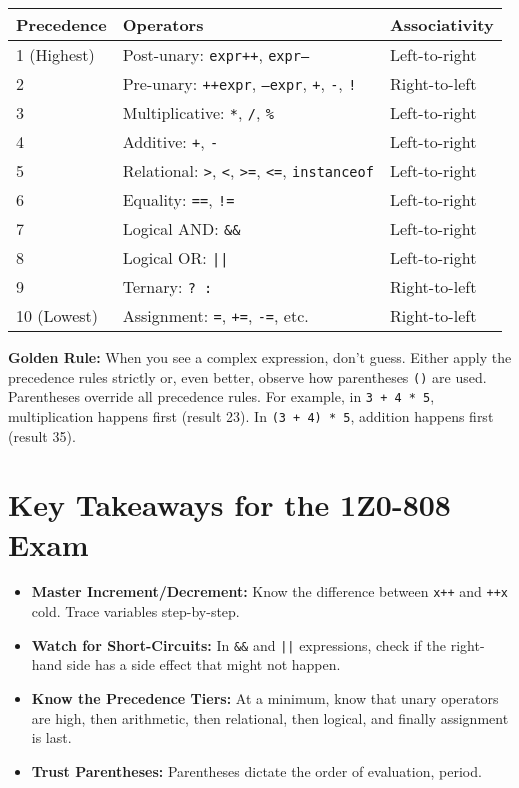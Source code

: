 \documentclass[12pt]{article}
\begin{document}
\begin{enumerate}[label=(\arabic*)]
\begin{tabular}{|l|l|l|}
\hline
\textbf{Precedence} & \textbf{Operators} & \textbf{Associativity} \\
\hline
1 (Highest) & Post-unary: \texttt{expr++}, \texttt{expr--} & Left-to-right \\
2 & Pre-unary: \texttt{++expr}, \texttt{--expr}, \texttt{+}, \texttt{-}, \texttt{!} & Right-to-left \\
3 & Multiplicative: \texttt{*}, \texttt{/}, \texttt{\%} & Left-to-right \\
4 & Additive: \texttt{+}, \texttt{-} & Left-to-right \\
5 & Relational: \texttt{>}, \texttt{<}, \texttt{>=}, \texttt{<=}, \texttt{instanceof} & Left-to-right \\
6 & Equality: \texttt{==}, \texttt{!=} & Left-to-right \\
7 & Logical AND: \texttt{\&\&} & Left-to-right \\
8 & Logical OR: \texttt{||} & Left-to-right \\
9 & Ternary: \texttt{? :} & Right-to-left \\
10 (Lowest) & Assignment: \texttt{=}, \texttt{+=}, \texttt{-=}, etc. & Right-to-left \\
\hline
\end{tabular}

\textbf{Golden Rule:} When you see a complex expression, don't guess. Either apply the precedence rules strictly or, even better, observe how parentheses \texttt{()} are used. Parentheses override all precedence rules. For example, in \texttt{3 + 4 * 5}, multiplication happens first (result 23). In \texttt{(3 + 4) * 5}, addition happens first (result 35).

\section*{Key Takeaways for the 1Z0-808 Exam}
\begin{itemize}
    \item \textbf{Master Increment/Decrement:} Know the difference between \texttt{x++} and \texttt{++x} cold. Trace variables step-by-step.
    \item \textbf{Watch for Short-Circuits:} In \texttt{\&\&} and \texttt{||} expressions, check if the right-hand side has a side effect that might not happen.
    \item \textbf{Know the Precedence Tiers:} At a minimum, know that unary operators are high, then arithmetic, then relational, then logical, and finally assignment is last.
    \item \textbf{Trust Parentheses:} Parentheses dictate the order of evaluation, period.
\end{itemize}
\end{enumerate}
\end{document}

